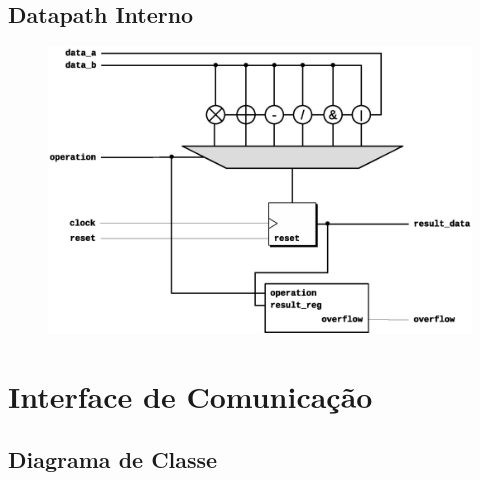 \documentclass{report}
\begin{document}
    \subsection{Datapath Interno}
      \begin{figure}[H]
        \centering
        \includegraphics[width=\linewidth]{datapath/processing_datapath.eps}
      \end{figure}
    \newpage

  \section{Interface de Comunicação}

    \subsection{Diagrama de Classe}
      \begin{figure}[H]
        \centering
        
      \end{figure}
\end{document}
